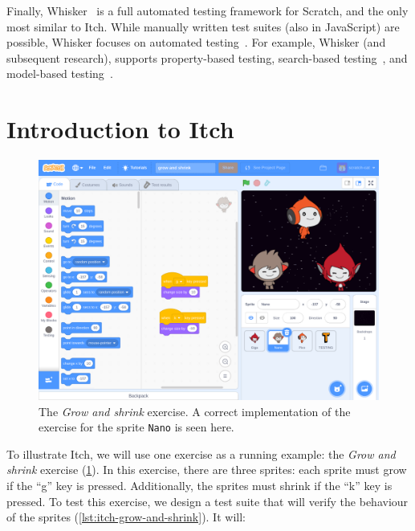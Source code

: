 \documentclass[../main]{subfiles}
\begin{document}
Finally, Whisker~\autocite{stahlbauerTestingScratchPrograms2019} is a full automated testing framework for Scratch, and the only most similar to Itch.
While manually written test suites (also in JavaScript) are possible, Whisker focuses on automated testing~\autocite{deinerAutomatedTestGeneration2023}.
For example, Whisker (and subsequent research), supports property-based testing, search-based testing~\autocite{deinerSearchBasedTestingScratch2020}, and model-based testing~\autocite{gotzModelbasedTestingScratch2022}.

\section{Introduction to Itch}\label{sec:introduction-to-itch}

\begin{figure}
    \begin{wide}
        \includegraphics[width=\linewidth]{itch-grow-and-shrink-code}
    \end{wide}
    \caption{
        The \emph{Grow and shrink} exercise.
        A correct implementation of the exercise for the sprite \texttt{Nano} is seen here.
    }
    \label{fig:itch-grow-shrink-code}
\end{figure}

To illustrate Itch, we will use one exercise as a running example: the \emph{Grow and shrink} exercise (\cref{fig:itch-grow-shrink-code}).
In this exercise, there are three sprites: each sprite must grow if the ``g'' key is pressed.
Additionally, the sprites must shrink if the ``k'' key is pressed.
To test this exercise, we design a test suite that will verify the behaviour of the sprites (\cref{lst:itch-grow-and-shrink}).
It will:
\end{document}
